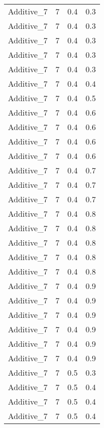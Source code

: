 \documentclass{article}
\begin{document}
\begin{longtable}[H]{lrrr}
 Additive\_7 &       7 &   0.4 &            0.3 \\
 Additive\_7 &       7 &   0.4 &            0.3 \\
 Additive\_7 &       7 &   0.4 &            0.3 \\
 Additive\_7 &       7 &   0.4 &            0.3 \\
 Additive\_7 &       7 &   0.4 &            0.3 \\
 Additive\_7 &       7 &   0.4 &            0.4 \\
 Additive\_7 &       7 &   0.4 &            0.5 \\
 Additive\_7 &       7 &   0.4 &            0.6 \\
 Additive\_7 &       7 &   0.4 &            0.6 \\
 Additive\_7 &       7 &   0.4 &            0.6 \\
 Additive\_7 &       7 &   0.4 &            0.6 \\
 Additive\_7 &       7 &   0.4 &            0.7 \\
 Additive\_7 &       7 &   0.4 &            0.7 \\
 Additive\_7 &       7 &   0.4 &            0.7 \\
 Additive\_7 &       7 &   0.4 &            0.8 \\
 Additive\_7 &       7 &   0.4 &            0.8 \\
 Additive\_7 &       7 &   0.4 &            0.8 \\
 Additive\_7 &       7 &   0.4 &            0.8 \\
 Additive\_7 &       7 &   0.4 &            0.8 \\
 Additive\_7 &       7 &   0.4 &            0.9 \\
 Additive\_7 &       7 &   0.4 &            0.9 \\
 Additive\_7 &       7 &   0.4 &            0.9 \\
 Additive\_7 &       7 &   0.4 &            0.9 \\
 Additive\_7 &       7 &   0.4 &            0.9 \\
 Additive\_7 &       7 &   0.4 &            0.9 \\
 Additive\_7 &       7 &   0.5 &            0.3 \\
 Additive\_7 &       7 &   0.5 &            0.4 \\
 Additive\_7 &       7 &   0.5 &            0.4 \\
 Additive\_7 &       7 &   0.5 &            0.4 \\

\end{longtable}
\end{document}

